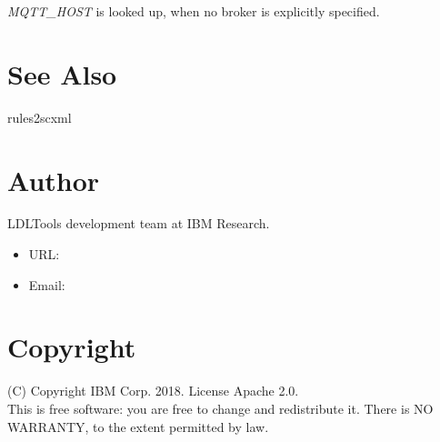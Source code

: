 \documentclass[fancy]{article}
\begin{document}
\emph{MQTT\_HOST} is looked up, when no broker is explicitly specified.

\section{See Also}
rules2scxml

\section{Author}
LDLTools development team at IBM Research.

\begin{itemize}
\item URL: 
\item Email: 
\end{itemize}

\section{Copyright}
(C) Copyright IBM Corp. 2018.
License Apache 2.0.\\

This is free software: you are free to change and redistribute it.
There is NO  WARRANTY,  to the extent permitted by law.
\end{document}
